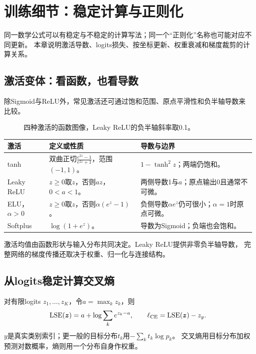 \chapter{训练细节：稳定计算与正则化}
\label{ch:numerics}

同一数学公式可以有稳定与不稳定的计算写法；同一个“正则化”名称也可能对应不同更新。
本章说明激活导数、logits损失、按坐标更新、权重衰减和梯度裁剪的计算关系。

\section{激活变体：看函数，也看导数}
\label{sec:numeric-activation}
除Sigmoid与ReLU外，常见激活还可通过饱和范围、原点平滑性和负半轴导数来比较。

\begin{figure}[htbp]
\centering
\caption{四种激活的函数图像，Leaky ReLU的负半轴斜率取0.1。}
\par\smallskip
{}
\end{figure}

\begin{center}
\small
\begin{tabularx}{\textwidth}{P{25mm}P{56mm}Y}
\toprule
激活 & 定义或性质 & 导数与边界\\
\midrule
tanh & 双曲正切$\frac{e^{2z}-1}{e^{2z}+1}$，范围$(-1,1)$。 & $1-\tanh^2z$；两端仍饱和。\\
Leaky ReLU & $z\geq0$取$z$，否则$az$，$0<a<1$。 & 两侧导数1与$a$；原点输出0且通常不可微。\\
ELU，$\alpha>0$ & $z\geq0$取$z$，否则$\alpha(e^z-1)$。 & 负侧导数$\alpha e^z$仍可很小；$\alpha=1$时原点可微。\\
Softplus & $\log(1+e^z)$。 & 导数为Sigmoid；负端也会饱和。\\
\bottomrule
\end{tabularx}
\end{center}

激活均值由函数形状与输入分布共同决定。Leaky ReLU提供非零负半轴导数，
完整网络的梯度传播还取决于权重、归一化与连接结构。

\section{从logits稳定计算交叉熵}
\label{sec:numeric-logits}
对有限logits $z_1,\ldots,z_K$，令$a=\max_k z_k$，则
\[
 \mathrm{LSE}(\boldsymbol{z})=a+\log\sum_k e^{z_k-a},\qquad
 \ell_{\mathrm{CE}}=\mathrm{LSE}(\boldsymbol{z})-z_y.
\]
$y$是真实类别索引；更一般的目标分布$t_k$用$-\sum_k t_k\log p_k$。
交叉熵用目标分布加权预测对数概率，熵则用一个分布自身作权重。

